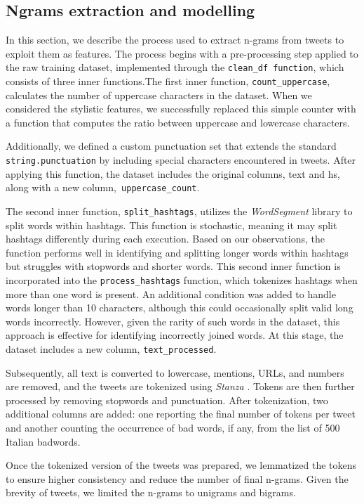 \subsection{Ngrams extraction and modelling}

In this section, we describe the process used to extract n-grams from tweets to exploit them as features.
The process begins with a pre-processing step applied to the raw training dataset, implemented through the \texttt{clean\_df function}, which consists of three inner functions.The first inner function, \texttt{count\_uppercase}, calculates the number of uppercase characters in the dataset.
When we considered the stylistic features, we successfully replaced this simple counter with a function that computes the ratio between uppercase and lowercase characters.

Additionally, we defined a custom punctuation set that extends the standard \texttt{string.punctuation} by including special characters encountered in tweets. After applying this function, the dataset includes the original columns, text and hs, along with a new column,\texttt{ uppercase\_count}.

The second inner function, \texttt{split\_hashtags}, utilizes the \emph{WordSegment} library to split words within hashtags. This function is stochastic, meaning it may split hashtags differently during each execution. Based on our observations, the function performs well in identifying and splitting longer words within hashtags but struggles with stopwords and shorter words.
This second inner function is incorporated into the \texttt{process\_hashtags} function, which tokenizes hashtags when more than one word is present.
An additional condition was added to handle words longer than 10 characters, although this could occasionally split valid long words incorrectly.
However, given the rarity of such words in the dataset, this approach is effective for identifying incorrectly joined words.
At this stage, the dataset includes a new column, \texttt{text\_processed}.

Subsequently, all text is converted to lowercase, mentions, URLs, and numbers are removed, and the tweets are tokenized using \emph{Stanza} \cite{stanza}.
Tokens are then further processed by removing stopwords and punctuation.
After tokenization, two additional columns are added: one reporting the final number of tokens per tweet and another counting the occurrence of bad words, if any, from the list of 500 Italian badwords.

Once the tokenized version of the tweets was prepared, we lemmatized the tokens to ensure higher consistency and reduce the number of final n-grams.
Given the brevity of tweets, we limited the n-grams to unigrams and bigrams.

